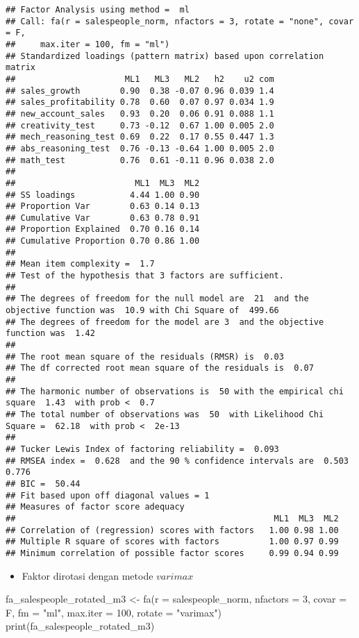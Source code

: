 \documentclass[
]{article}
\newenvironment{Shaded}{\begin{snugshade}}{\end{snugshade}}
\newcommand{\AttributeTok}[1]{\textcolor[rgb]{0.77,0.63,0.00}{#1}}
\newcommand{\DecValTok}[1]{\textcolor[rgb]{0.00,0.00,0.81}{#1}}
\newcommand{\FunctionTok}[1]{\textcolor[rgb]{0.00,0.00,0.00}{#1}}
\newcommand{\NormalTok}[1]{#1}
\newcommand{\OtherTok}[1]{\textcolor[rgb]{0.56,0.35,0.01}{#1}}
\newcommand{\StringTok}[1]{\textcolor[rgb]{0.31,0.60,0.02}{#1}}
\providecommand{\tightlist}{%
  \setlength{\itemsep}{0pt}\setlength{\parskip}{0pt}}
\begin{document}
\begin{verbatim}
## Factor Analysis using method =  ml
## Call: fa(r = salespeople_norm, nfactors = 3, rotate = "none", covar = F, 
##     max.iter = 100, fm = "ml")
## Standardized loadings (pattern matrix) based upon correlation matrix
##                      ML1   ML3   ML2   h2    u2 com
## sales_growth        0.90  0.38 -0.07 0.96 0.039 1.4
## sales_profitability 0.78  0.60  0.07 0.97 0.034 1.9
## new_account_sales   0.93  0.20  0.06 0.91 0.088 1.1
## creativity_test     0.73 -0.12  0.67 1.00 0.005 2.0
## mech_reasoning_test 0.69  0.22  0.17 0.55 0.447 1.3
## abs_reasoning_test  0.76 -0.13 -0.64 1.00 0.005 2.0
## math_test           0.76  0.61 -0.11 0.96 0.038 2.0
## 
##                        ML1  ML3  ML2
## SS loadings           4.44 1.00 0.90
## Proportion Var        0.63 0.14 0.13
## Cumulative Var        0.63 0.78 0.91
## Proportion Explained  0.70 0.16 0.14
## Cumulative Proportion 0.70 0.86 1.00
## 
## Mean item complexity =  1.7
## Test of the hypothesis that 3 factors are sufficient.
## 
## The degrees of freedom for the null model are  21  and the objective function was  10.9 with Chi Square of  499.66
## The degrees of freedom for the model are 3  and the objective function was  1.42 
## 
## The root mean square of the residuals (RMSR) is  0.03 
## The df corrected root mean square of the residuals is  0.07 
## 
## The harmonic number of observations is  50 with the empirical chi square  1.43  with prob <  0.7 
## The total number of observations was  50  with Likelihood Chi Square =  62.18  with prob <  2e-13 
## 
## Tucker Lewis Index of factoring reliability =  0.093
## RMSEA index =  0.628  and the 90 % confidence intervals are  0.503 0.776
## BIC =  50.44
## Fit based upon off diagonal values = 1
## Measures of factor score adequacy             
##                                                    ML1  ML3  ML2
## Correlation of (regression) scores with factors   1.00 0.98 1.00
## Multiple R square of scores with factors          1.00 0.97 0.99
## Minimum correlation of possible factor scores     0.99 0.94 0.99
\end{verbatim}

\begin{itemize}
\tightlist
\item
  Faktor dirotasi dengan metode \(varimax\)
\end{itemize}

\begin{Shaded}
\begin{Highlighting}[]
\NormalTok{fa\_salespeople\_rotated\_m3 }\OtherTok{\textless{}{-}} \FunctionTok{fa}\NormalTok{(}\AttributeTok{r =}\NormalTok{ salespeople\_norm, }\AttributeTok{nfactors =} \DecValTok{3}\NormalTok{, }\AttributeTok{covar =}\NormalTok{ F, }\AttributeTok{fm =} \StringTok{"ml"}\NormalTok{, }\AttributeTok{max.iter =} \DecValTok{100}\NormalTok{, }\AttributeTok{rotate =} \StringTok{"varimax"}\NormalTok{)}
\FunctionTok{print}\NormalTok{(fa\_salespeople\_rotated\_m3)}
\end{Highlighting}
\end{Shaded}
\end{document}
